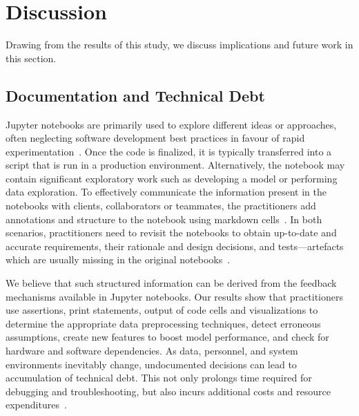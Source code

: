 
\section{Discussion}\label{sec:discuss}

Drawing from the results of this study, we discuss implications and future work in this section.

\subsection{Documentation and Technical Debt}

Jupyter notebooks are primarily used to explore different ideas or approaches, often neglecting software development best practices in favour of rapid experimentation~\cite{kery2018story,rule2018exploration,pimentel2019large-scale}. Once the code is finalized, it is typically transferred into a script that is run in a production environment. Alternatively, the notebook may contain significant exploratory work such as developing a model or performing data exploration. To effectively communicate the information present in the notebooks with clients, collaborators or teammates, the practitioners add annotations and structure to the notebook using markdown cells~\cite{kery2018story,rule2018exploration}. In both scenarios, practitioners need to revisit the notebooks to obtain up-to-date and accurate requirements, their rationale and design decisions, and tests---artefacts which are usually missing in the original notebooks~\cite{pimentel2019large-scale,psallidas2019data,grotov2022large-scale}.

We believe that such structured information can be derived from the feedback mechanisms available in Jupyter notebooks. Our results show that practitioners use assertions, print statements, output of code cells and visualizations to determine the appropriate data preprocessing techniques, detect erroneous assumptions, create new features to boost model performance, and check for hardware and software dependencies. As data, personnel, and system environments inevitably change, undocumented decisions can lead to accumulation of technical debt. This not only prolongs time required for debugging and troubleshooting, but also incurs additional costs and resource expenditures~\cite{sculley2015hidden,amershi2019software,sambasivan2021everyone}.

